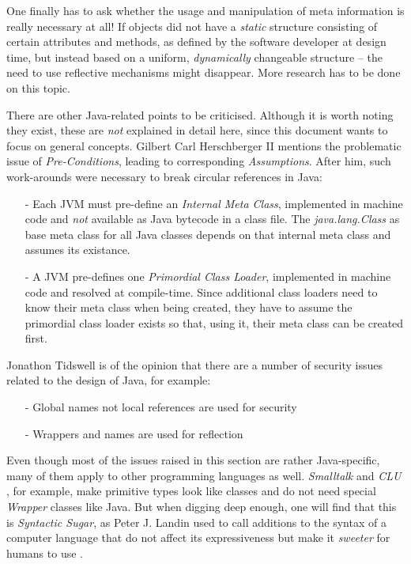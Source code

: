 One finally has to ask whether the usage and manipulation of meta information is
really necessary at all! If objects did not have a \emph{static} structure
consisting of certain attributes and methods, as defined by the software
developer at design time, but instead based on a uniform, \emph{dynamically}
changeable structure -- the need to use reflective mechanisms might disappear.
More research has to be done on this topic.

There are other Java-related points to be criticised. Although it is worth
noting they exist, these are \emph{not} explained in detail here, since this
document wants to focus on general concepts. Gilbert Carl Herschberger II
\cite{josgeneral} mentions the problematic issue of \emph{Pre-Conditions},
leading to corresponding \emph{Assumptions}. After him, such work-arounds were
necessary to break circular references in Java:

\begin{itemize}
    \item[-] Each JVM must pre-define an \emph{Internal Meta Class}, implemented
        in machine code and \emph{not} available as Java bytecode in a class file.
        The \emph{java.lang.Class} as base meta class for all Java classes depends
        on that internal meta class and assumes its existance.
    \item[-] A JVM pre-defines one \emph{Primordial Class Loader}, implemented in
        machine code and resolved at compile-time. Since additional class loaders
        need to know their meta class when being created, they have to assume the
        primordial class loader exists so that, using it, their meta class can be
        created first.
\end{itemize}

Jonathon Tidswell \cite{josgeneral} is of the opinion that there are a number of
security issues related to the design of Java, for example:

\begin{itemize}
    \item[-] Global names not local references are used for security
    \item[-] Wrappers and names are used for reflection
\end{itemize}

Even though most of the issues raised in this section are rather Java-specific,
many of them apply to other programming languages as well. \emph{Smalltalk}
\cite{smalltalk} and \emph{CLU} \cite{clu}, for example, make primitive types
look like classes and do not need special \emph{Wrapper} classes like Java. But
when digging deep enough, one will find that this is \emph{Syntactic Sugar}, as
Peter J. Landin used to call additions to the syntax of a computer language
that do not affect its expressiveness but make it \emph{sweeter} for humans to
use \cite{wikipedia}.
